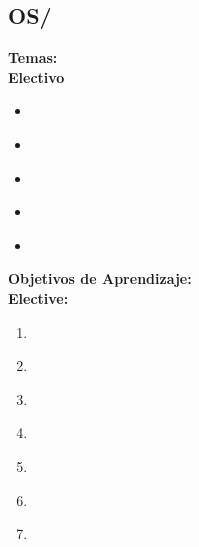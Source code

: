 \subsection{OS/\OSDeviceManagement}\label{sec:BOK:OSDeviceManagement}
\noindent \textbf{Temas:}\\
\noindent \textbf{Electivo}
\begin{itemize}
	\item \OSDeviceManagementTopicCharacteristics\label{sec:BOK:OSDeviceManagementTopicCharacteristics}
	\item \OSDeviceManagementTopicAbstracting\label{sec:BOK:OSDeviceManagementTopicAbstracting}
	\item \OSDeviceManagementTopicBuffering\label{sec:BOK:OSDeviceManagementTopicBuffering}
	\item \OSDeviceManagementTopicDirect\label{sec:BOK:OSDeviceManagementTopicDirect}
	\item \OSDeviceManagementTopicRecovery\label{sec:BOK:OSDeviceManagementTopicRecovery}
\end{itemize}


\noindent \textbf{Objetivos de Aprendizaje:}\\
\noindent \textbf{Elective:}
\begin{enumerate}
	\setcounter{enumi}{0}
	\item \OSDeviceManagementLOExplainTheBetween\xspace[\OSDeviceManagementLOExplainTheBetweenLevel]\label{sec:BOK:OSDeviceManagementLOExplainTheBetween}
	\item \OSDeviceManagementLOIdentifyTheThe\xspace[\OSDeviceManagementLOIdentifyTheTheLevel]\label{sec:BOK:OSDeviceManagementLOIdentifyTheThe}
	\item \OSDeviceManagementLOExplainBuffering\xspace[\OSDeviceManagementLOExplainBufferingLevel]\label{sec:BOK:OSDeviceManagementLOExplainBuffering}
	\item \OSDeviceManagementLODifferentiateThe\xspace[\OSDeviceManagementLODifferentiateTheLevel]\label{sec:BOK:OSDeviceManagementLODifferentiateThe}
	\item \OSDeviceManagementLODescribeTheDisadvantagesMemory\xspace[\OSDeviceManagementLODescribeTheDisadvantagesMemoryLevel]\label{sec:BOK:OSDeviceManagementLODescribeTheDisadvantagesMemory}
	\item \OSDeviceManagementLOIdentifyTheFailure\xspace[\OSDeviceManagementLOIdentifyTheFailureLevel]\label{sec:BOK:OSDeviceManagementLOIdentifyTheFailure}
	\item \OSDeviceManagementLOImplementADriver\xspace[\OSDeviceManagementLOImplementADriverLevel]\label{sec:BOK:OSDeviceManagementLOImplementADriver}
\end{enumerate}


